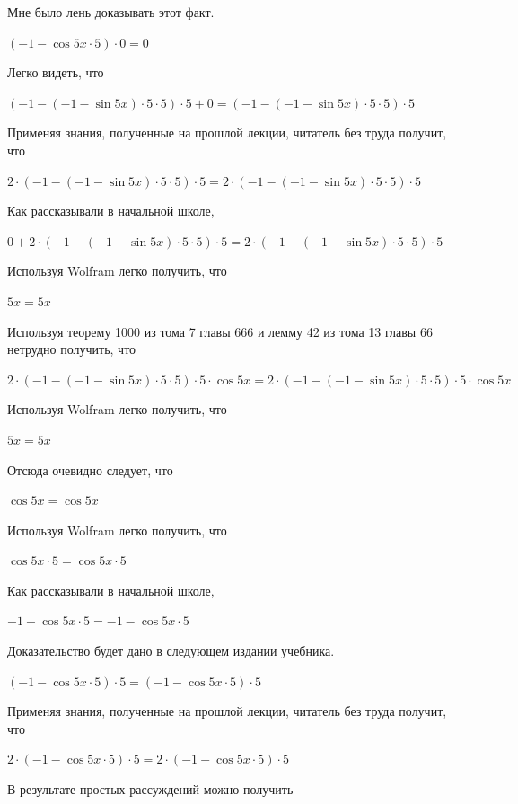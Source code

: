 \documentclass[12pt,a4paper,fleqn]{article}
\theoremstyle{definition}
\begin{document}
Мне было лень доказывать этот факт.

$( -1  - \cos 5  x  \cdot  5 ) \cdot  0  =  0 $

Легко видеть, что 

$( -1  - ( -1  - \sin 5  x ) \cdot  5  \cdot  5 ) \cdot  5  +  0  = ( -1  - ( -1  - \sin 5  x ) \cdot  5  \cdot  5 ) \cdot  5 $

Применяя знания, полученные на прошлой лекции, читатель без труда получит, что 

$ 2  \cdot ( -1  - ( -1  - \sin 5  x ) \cdot  5  \cdot  5 ) \cdot  5  =  2  \cdot ( -1  - ( -1  - \sin 5  x ) \cdot  5  \cdot  5 ) \cdot  5 $

Как рассказывали в начальной школе, 

$ 0  +  2  \cdot ( -1  - ( -1  - \sin 5  x ) \cdot  5  \cdot  5 ) \cdot  5  =  2  \cdot ( -1  - ( -1  - \sin 5  x ) \cdot  5  \cdot  5 ) \cdot  5 $

Используя Wolfram легко получить, что 

$ 5  x  =  5  x $

Используя теорему 1000 из тома 7 главы 666 и лемму 42 из тома 13 главы 66 нетрудно получить, что 

$ 2  \cdot ( -1  - ( -1  - \sin 5  x ) \cdot  5  \cdot  5 ) \cdot  5  \cdot \cos 5  x  =  2  \cdot ( -1  - ( -1  - \sin 5  x ) \cdot  5  \cdot  5 ) \cdot  5  \cdot \cos 5  x $

Используя Wolfram легко получить, что 

$ 5  x  =  5  x $

Отсюда очевидно следует, что 

$\cos 5  x  = \cos 5  x $

Используя Wolfram легко получить, что 

$\cos 5  x  \cdot  5  = \cos 5  x  \cdot  5 $

Как рассказывали в начальной школе, 

$ -1  - \cos 5  x  \cdot  5  =  -1  - \cos 5  x  \cdot  5 $

Доказательство будет дано в следующем издании учебника. 

$( -1  - \cos 5  x  \cdot  5 ) \cdot  5  = ( -1  - \cos 5  x  \cdot  5 ) \cdot  5 $

Применяя знания, полученные на прошлой лекции, читатель без труда получит, что 

$ 2  \cdot ( -1  - \cos 5  x  \cdot  5 ) \cdot  5  =  2  \cdot ( -1  - \cos 5  x  \cdot  5 ) \cdot  5 $

В результате простых рассуждений можно получить 
\end{document}
